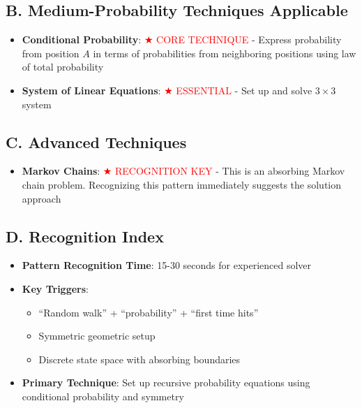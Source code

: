 \documentclass[12pt]{article}
\begin{document}
\begin{techniquesbox}
\subsection*{B. Medium-Probability Techniques Applicable}
\begin{itemize}[leftmargin=*]
    \item \textbf{Conditional Probability}: \textcolor{red}{$\bigstar$ CORE TECHNIQUE} - Express probability from position $A$ in terms of probabilities from neighboring positions using law of total probability
    
    \item \textbf{System of Linear Equations}: \textcolor{red}{$\bigstar$ ESSENTIAL} - Set up and solve $3 \times 3$ system
\end{itemize}

\subsection*{C. Advanced Techniques}
\begin{itemize}[leftmargin=*]
    \item \textbf{Markov Chains}: \textcolor{red}{$\bigstar$ RECOGNITION KEY} - This is an absorbing Markov chain problem. Recognizing this pattern immediately suggests the solution approach
\end{itemize}

\subsection*{D. Recognition Index}
\begin{itemize}[leftmargin=*]
    \item \textbf{Pattern Recognition Time}: 15-30 seconds for experienced solver
    
    \item \textbf{Key Triggers}:
    \begin{itemize}
        \item ``Random walk'' + ``probability'' + ``first time hits''
        \item Symmetric geometric setup
        \item Discrete state space with absorbing boundaries
    \end{itemize}
    
    \item \textbf{Primary Technique}: Set up recursive probability equations using conditional probability and symmetry
    

\end{itemize}
\end{techniquesbox}
\end{document}
